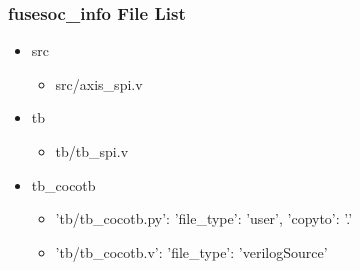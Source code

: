 \subsubsection{fusesoc\_info File List}
\begin{itemize}
\item src
	\begin{itemize}
	\item src/axis\_spi.v
	\end{itemize}
\item tb
	\begin{itemize}
	\item tb/tb\_spi.v
	\end{itemize}
\item tb\_cocotb
	\begin{itemize}
	\item {'tb/tb\_cocotb.py': {'file\_type': 'user', 'copyto': '.'}}
	\item {'tb/tb\_cocotb.v': {'file\_type': 'verilogSource'}}
	\end{itemize}
\end{itemize}
